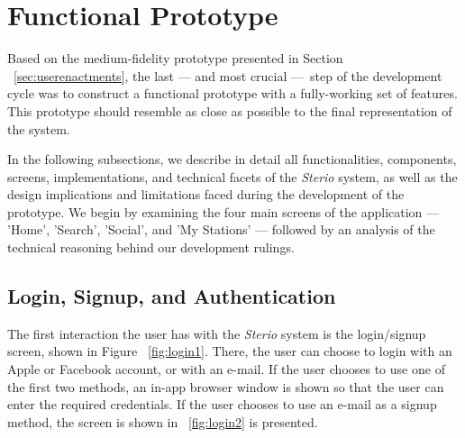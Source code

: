 
\section{Functional Prototype}

Based on the medium-fidelity prototype presented in Section ~\ref{sec:userenactments}, the last — and most crucial — step of the development cycle was to construct a functional prototype with a fully-working set of features. This prototype should resemble as close as possible to the final representation of the system. 

In the following subsections, we describe in detail all functionalities, components, screens, implementations, and technical facets of the \textit{Sterio} system, as well as the design implications and limitations faced during the development of the prototype. We begin by examining the four main screens of the application — 'Home', 'Search', 'Social', and 'My Stations' — followed by an analysis of the technical reasoning behind our development rulings.

\newpage
\subsection{Login, Signup, and Authentication}
\label{subsec:lsa}

The first interaction the user has with the \textit{Sterio} system is the login/signup screen, shown in Figure ~\ref{fig:login1}. There, the user can choose to login with an Apple or Facebook account, or with an e-mail. If the user chooses to use one of the first two methods, an in-app browser window is shown so that the user can enter the required credentials. If the user chooses to use an e-mail as a signup method, the screen is shown in ~\ref{fig:login2} is presented.


